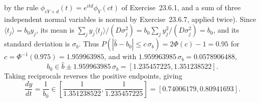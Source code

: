 by the rule $\phi_{cY+d}(t)=e^{itd}\phi_Y(ct)$ of Exercise~23.6.1, and a
sum of three independent normal variables is normal by
Exercise~23.6.7, applied twice). Since
$\langle t_j\rangle=b_0y_j$, its mean is
$\sum_jy_j\langle t_j\rangle/(D\sigma_j^2)
=b_0\sum_jy_j^2/(D\sigma_j^2)=b_0$, and its standard deviation is
$\sigma_b$. Thus
$P(|\widehat b-b_0|\le c\,\sigma_b)=2\Phi(c)-1=0.95$ for
$c=\Phi^{-1}(0.975)=1.959963985$, and with
$1.959963985\,\sigma_b=0.0578906488$,
\[
b_0\in\widehat b\pm1.959963985\,\sigma_b=[1.235457225,1.351238522].
\]
Taking reciprocals reverses the positive endpoints, giving
\[
\frac{dy}{dt}=\frac1{b_0}\in\left[\frac1{1.351238522},
\frac1{1.235457225}\right]=[0.74006179,0.80941693].
\]



